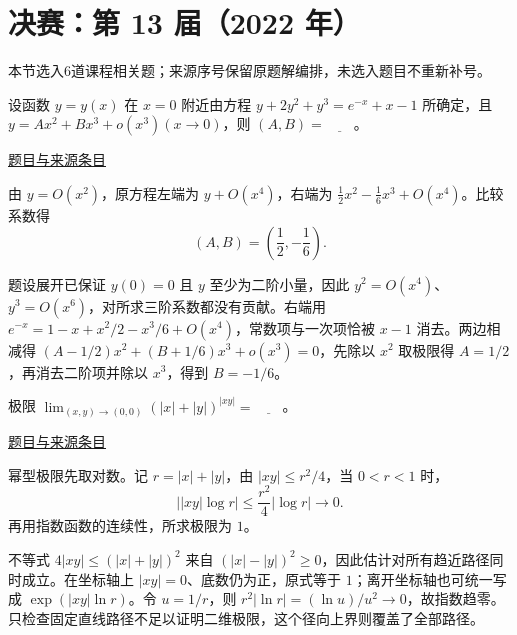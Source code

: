 \documentclass[12pt,fontset=fandol]{ctexart}
\begin{document}
\section{决赛：第 13 届（2022 年）}

本节选入6道课程相关题；来源序号保留原题解编排，未选入题目不重新补号。

\begin{example}[来源序号1]\label{ex:fin13-high:1}\label{pr:fin13-high:1}

设函数 $y = y(x)$ 在 $x = 0$ 附近由方程 $y + 2y^2 + y^3 = e^{-x} + x - 1$ 所确定，且 $y = Ax^2 + Bx^3 + o\left(x^3\right)(x \rightarrow 0)$，则 $(A,B) = \underline{\qquad}$。

\par\href{https://github.com/lzxcr/cmc-mathematics/blob/64916fa1fdbc3e444a652eca204d5669058ee321/src/problems/finals/13/01.md}{题目与来源条目}

\end{example}

\begin{solve}\label{ans:fin13-high:1}

由 $y=O(x^2)$，原方程左端为 $y+O(x^4)$，右端为 $\frac12x^2-\frac16x^3+O(x^4)$。比较系数得
\[
(A,B)=\boxed{\left(\frac12,-\frac16\right)}.
\]

题设展开已保证 $y(0)=0$ 且 $y$ 至少为二阶小量，因此 $y^2=O(x^4)$、$y^3=O(x^6)$，对所求三阶系数都没有贡献。右端用 $e^{-x}=1-x+x^2/2-x^3/6+O(x^4)$，常数项与一次项恰被 $x-1$ 消去。两边相减得 $(A-1/2)x^2+(B+1/6)x^3+o(x^3)=0$，先除以 $x^2$ 取极限得 $A=1/2$，再消去二阶项并除以 $x^3$，得到 $B=-1/6$。

\end{solve}

\begin{example}[来源序号2]\label{ex:fin13-high:2}\label{pr:fin13-high:2}

极限 $\lim_{(x,y) \rightarrow (0,0)} \left( |x| + |y| \right)^{|xy|} = \underline{\qquad}$。

\par\href{https://github.com/lzxcr/cmc-mathematics/blob/64916fa1fdbc3e444a652eca204d5669058ee321/src/problems/finals/13/02.md}{题目与来源条目}

\end{example}

\begin{solve}\label{ans:fin13-high:2}

幂型极限先取对数。记 $r=|x|+|y|$，由 $|xy|\le r^2/4$，当 $0<r<1$ 时，
\[
\bigl||xy|\log r\bigr|\le\frac{r^2}{4}|\log r|\longrightarrow0.
\]
再用指数函数的连续性，所求极限为 $\boxed1$。

不等式 $4|xy|\le(|x|+|y|)^2$ 来自 $(|x|-|y|)^2\ge0$，因此估计对所有趋近路径同时成立。在坐标轴上 $|xy|=0$、底数仍为正，原式等于 $1$；离开坐标轴也可统一写成 $\exp(|xy|\ln r)$。令 $u=1/r$，则 $r^2|\ln r|=(\ln u)/u^2\to0$，故指数趋零。只检查固定直线路径不足以证明二维极限，这个径向上界则覆盖了全部路径。

\end{solve}
\end{document}
